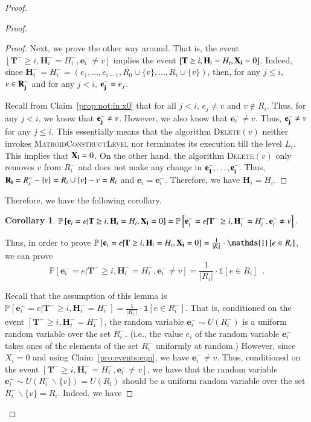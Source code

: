 \documentclass[11pt]{article}
\newtheorem{corollary}[theorem]{Corollary}
\renewcommand{\Pr}[1]{\ensuremath{\mathbb{P}\left[#1\right]}}
\newcommand{\ind}[1]{\ensuremath{\mathds{1}\left[#1\right]}}
\newcommand{\MatroidConstLevel}{\textsc{MatroidConstructLevel}}
\newcommand{\deletev}{{\textsc{Delete}}}
\newcommand{\bE}{\ensuremath{\mathbf{e}}}
\newcommand{\bT}{\ensuremath{\mathbf{T}}}
\newcommand{\bH}{\ensuremath{\mathbf{H}}}
\begin{document}
\begin{proof}
\begin{proof}
\begin{proof}
Next, we prove the other way around. 
That is, the event $[\bT^- \geq i, \bH_i^- = H_i^-,\bE_i^- \neq v]$ 
implies the event $[\bT \geq i, \bH_i = H_i, \bold{X_i} = 0]$. 
Indeed, since $\bH_i^- = H_i^- = (e_1, \dots, e_{i-1}, R_0 \cup \{v\} , \dots, R_i \cup \{v\})$, 
then, for any $j \leq i$, $v \in \bold{R_j^-}$ and for any $j < i$, $\bold{e_j^-} = e_j$. 

Recall from Claim~\ref{prop:not:in:x0} that 
for all $j < i$, $e_j \ne v$ and $v \notin R_i$. 
Thus, for any $j < i$, we know that $\bold{e_j^-} \ne v$. 
However, we also know that $\bE_i^- \neq v$. 
Thus, $\bold{e_j^-} \ne v$ for any $j \leq i$.
This essentially means that the algorithm \deletev$(v)$ neither invokes \MatroidConstLevel{} 
nor terminates its execution till the level $L_i$. 
This implies that $\bold{X_i} = 0$. 
On the other hand, the algorithm \deletev$(v)$ only removes $v$ from $R_i^-$ and 
does not make any change in $\bold{e_1^-, \dots, e_i^-}$. 
Thus, $\bold{R_i} = R_i^- - \{v\}= R_i \cup \{v\} - v = R_i$ and 
$\bE_i = \bE_i^-$.  Therefore,  we have $\bH_i = H_i$. 
\end{proof}




Therefore, we have the following corollary.
\begin{corollary}
\label{cor:eqn:events}
$\Pr{\bE_i = e | \bT \geq i, \bH_i = H_i, \bold{X_i} = 0} =  \Pr{\bE_i^- = e | \bT^- \geq i, \bH_i^- = H_i^-, \bE_i^- \neq v} $. 
\end{corollary}

Thus, in order to prove 
$\Pr{\bE_i = e | \bT \geq i, \bH_i = H_i, \bold{X_i} = 0} = \frac{1}{|R_i|} \cdot \ind{e \in R_i}$, 
we can prove 
\[
\Pr{\bE_i^- = e | \bT^- \geq i, \bH_i^- = H_i^-, \bE_i^- \neq v} = \frac{1}{|R_i|} \cdot \ind{e \in R_i} \enspace .
\]



Recall that the assumption of this lemma is  
$ \Pr{\bE_i^- = e | \bT^- \geq i, \bH_i^- = H_i^-} = 
  \frac{1}{|R_i^{-}|} \cdot \ind{e \in R_i^{-}} $. 
That is, conditioned on the event $[\bT^- \geq i, \bH_i^- = H_i^-]$, 
the random variable $\bE_i^- \sim U(R_i^-)$ is a uniform random variable over the set $R_i^-$. 
(i.e., the value $e_i$ of the random variable $\bE_i^-$ takes ones of the elements of the set $R_i^-$ uniformly at random.)  
However, since $X_i =0$ and using Claim~\ref{pro:events:eqn}, we have $\bE_i^- \ne v$. 
Thus, conditioned on the event $ [\bT^- \geq i, \bH_i^- = H_i^-, \bE_i^- \ne v]$, 
we have that the random variable $\bE_i^- \sim U(R_i^- \backslash \{v\} ) = U(R_i)$ 
should be a uniform random variable over the set $R_i^- \backslash \{v\} = R_i$. 
Indeed, we have 



\end{proof}
\end{proof}
\end{document}
